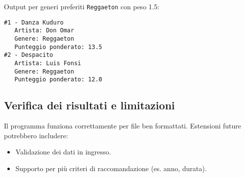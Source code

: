\documentclass[a4paper,11pt]{article}
\begin{document}
Output per generi preferiti \texttt{Reggaeton} con peso 1.5:
\begin{verbatim}
#1 - Danza Kuduro
   Artista: Don Omar
   Genere: Reggaeton
   Punteggio ponderato: 13.5
#2 - Despacito
   Artista: Luis Fonsi
   Genere: Reggaeton
   Punteggio ponderato: 12.0
\end{verbatim}

\subsection{Verifica dei risultati e limitazioni}
Il programma funziona correttamente per file ben formattati. Estensioni future potrebbero includere:
\begin{itemize}
    \item Validazione dei dati in ingresso.
    \item Supporto per più criteri di raccomandazione (es. anno, durata).
\end{itemize}
\end{document}
